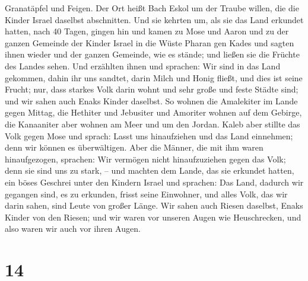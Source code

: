 Granatäpfel und Feigen.  Der Ort heißt Bach Eskol um der
Traube willen, die die Kinder Israel daselbst abschnitten.
 Und sie kehrten um, als sie das Land erkundet hatten,
nach 40 Tagen,  gingen hin und kamen zu Mose und Aaron
und zu der ganzen Gemeinde der Kinder Israel in die Wüste Pharan gen
Kades und sagten ihnen wieder und der ganzen Gemeinde, wie es stände;
und ließen sie die Früchte des Landes sehen.  Und
erzählten ihnen und sprachen: Wir sind in das Land gekommen, dahin ihr
uns sandtet, darin Milch und Honig fließt, und dies ist seine Frucht;
 nur, dass starkes Volk darin wohnt und sehr große und
feste Städte sind; und wir sahen auch Enaks Kinder daselbst.
 So wohnen die Amalekiter im Lande gegen Mittag, die
Hethiter und Jebusiter und Amoriter wohnen auf dem Gebirge, die
Kanaaniter aber wohnen am Meer und um den Jordan.  Kaleb
aber stillte das Volk gegen Mose und sprach: Lasst uns hinaufziehen und
das Land einnehmen; denn wir können es überwältigen. 
Aber die Männer, die mit ihm waren hinaufgezogen, sprachen: Wir vermögen
nicht hinaufzuziehen gegen das Volk; denn sie sind uns zu stark, --
 und machten dem Lande, das sie erkundet hatten, ein
böses Geschrei unter den Kindern Israel und sprachen: Das Land, dadurch
wir gegangen sind, es zu erkunden, frisst seine Einwohner, und alles
Volk, das wir darin sahen, sind Leute von großer Länge. 
Wir sahen auch Riesen daselbst, Enaks Kinder von den Riesen; und wir
waren vor unseren Augen wie Heuschrecken, und also waren wir auch vor
ihren Augen.

\hypertarget{section-13}{%
\section{14}\label{section-13}}

